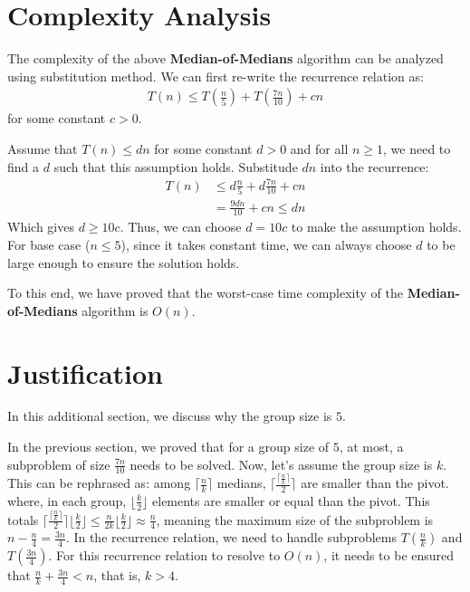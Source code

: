 \documentclass[11pt, a4paper, oneside]{memoir}
\begin{document}
\section{Complexity Analysis}
The complexity of the above \textbf{Median-of-Medians} algorithm can be analyzed using substitution method.
We can first re-write the recurrence relation as:
\begin{align*}
    T(n) \leq T(\frac{n}{5}) + T(\frac{7n}{10}) + cn
\end{align*}
for some constant $c > 0$.

Assume that $T(n) \leq dn$ for some constant $d > 0$ and for all $n \geq 1$, we need to find a $d$ such that this assumption holds.
Substitude $dn$ into the recurrence:
\begin{align*}
    T(n) &\leq d\frac{n}{5} + d\frac{7n}{10} + cn \\
    &= \frac{9dn}{10} + cn \leq dn
\end{align*}
Which gives $d \geq 10c$. Thus, we can choose $d = 10c$ to make the assumption holds.
For base case ($n \leq 5$), since it takes constant time, we can always choose $d$ to be large enough to ensure the solution holds.

To this end, we have proved that the worst-case time complexity of the \textbf{Median-of-Medians} algorithm is $O(n)$.

\section*{Justification}
\label{just}
In this additional section, we discuss why the group size is $5$.

In the previous section, we proved that for a group size of $5$, at most, a subproblem of size $\frac{7n}{10}$ needs to be solved.
Now, let's assume the group size is $k$.
This can be rephrased as: among $\lceil \frac{n}{k} \rceil$ medians, $\lceil \frac{\lceil \frac{n}{k} \rceil}{2} \rceil$ are smaller than the pivot.
where, in each group, $\lfloor \frac{k}{2} \rfloor$ elements are smaller or equal than the pivot. This totals $\lceil \frac{\lceil \frac{n}{k} \rceil}{2} \rceil \lfloor \frac{k}{2} \rfloor \leq \frac{n}{2k} \lfloor \frac{k}{2} \rfloor \approx \frac{n}{4}$\footnotemark,
meaning the maximum size of the subproblem is $n-\frac{n}{4}=\frac{3n}{4}$.
In the recurrence relation, we need to handle subproblems $T(\frac{n}{k})$ and $T(\frac{3n}{4})$.
For this recurrence relation to resolve to $O(n)$, it needs to be ensured that $\frac{n}{k}+\frac{3n}{4} < n$, that is, $k > 4$.
\end{document}
